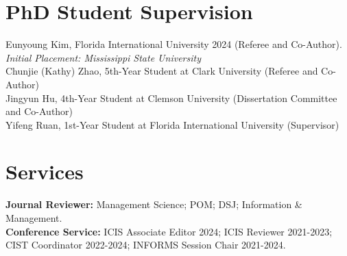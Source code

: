 \documentclass[margin,line]{resume}
\begin{document}
\begin{resume}


      \section{\mysidestyle PhD Student Supervision} 
         Eunyoung Kim, Florida International University 2024 (Referee and Co-Author). \textit{Initial Placement: Mississippi State University} \\
         Chunjie (Kathy) Zhao, 5th-Year Student at Clark University (Referee and Co-Author)\\
         Jingyun Hu, 4th-Year Student at Clemson University (Dissertation Committee and Co-Author)\\
         Yifeng Ruan, 1st-Year Student at Florida International University (Supervisor)

      \section{\mysidestyle Services} 
         \textbf{Journal Reviewer:} Management Science; POM; DSJ; Information \& Management.\\
         \textbf{Conference Service:} ICIS Associate Editor 2024; ICIS Reviewer 2021-2023; CIST Coordinator 2022-2024; INFORMS Session Chair 2021-2024.


\end{resume}
\end{document}
